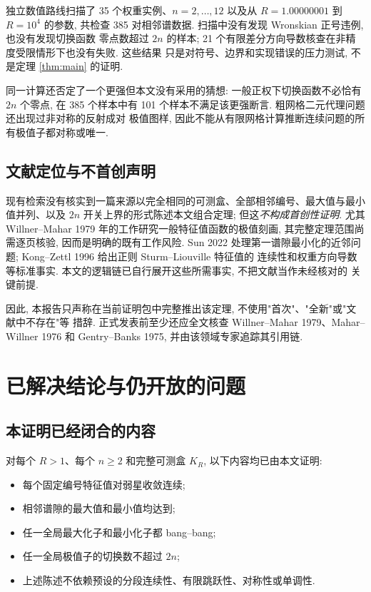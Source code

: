 \documentclass[UTF8]{ctexart}
\begin{document}
独立数值路线扫描了 35 个权重实例、$n=2,\dots,12$ 以及从 $R=1.00000001$ 到 $R=10^4$
的参数, 共检查 385 对相邻谱数据. 扫描中没有发现 Wronskian 正号违例, 也没有发现切换函数
零点数超过 $2n$ 的样本; 21 个有限差分方向导数核查在非精度受限情形下也没有失败. 这些结果
只是对符号、边界和实现错误的压力测试, 不是定理 \ref{thm:main} 的证明.

同一计算还否定了一个更强但本文没有采用的猜想: 一般正权下切换函数不必恰有 $2n$ 个零点,
在 385 个样本中有 101 个样本不满足该更强断言. 粗网格二元代理问题还出现过非对称的反射成对
极值图样, 因此不能从有限网格计算推断连续问题的所有极值子都对称或唯一.

\subsection{文献定位与不首创声明}

现有检索没有核实到一篇来源以完全相同的可测盒、全部相邻编号、最大值与最小值并列、以及
$2n$ 开关上界的形式陈述本文组合定理; 但这\emph{不构成首创性证明}. 尤其 Willner--Mahar 1979
年的工作研究一般特征值函数的极值刻画, 其完整定理范围尚需逐页核验, 因而是明确的既有工作风险.
Sun 2022 处理第一谱隙最小化的近邻问题; Kong--Zettl 1996 给出正则 Sturm--Liouville 特征值的
连续性和权重方向导数等标准事实. 本文的逻辑链已自行展开这些所需事实, 不把文献当作未经核对的
关键前提.

因此, 本报告只声称在当前证明包中完整推出该定理, 不使用"首次"、"全新"或"文献中不存在"等
措辞. 正式发表前至少还应全文核查 Willner--Mahar 1979、Mahar--Willner 1976 和 Gentry--Banks
1975, 并由该领域专家追踪其引用链.

\section{已解决结论与仍开放的问题}
\subsection{本证明已经闭合的内容}

对每个 $R>1$、每个 $n\ge2$ 和完整可测盒 $K_R$, 以下内容均已由本文证明:
\begin{itemize}
	\item 每个固定编号特征值对弱星收敛连续;
	\item 相邻谱隙的最大值和最小值均达到;
	\item 任一全局最大化子和最小化子都 bang--bang;
	\item 任一全局极值子的切换数不超过 $2n$;
	\item 上述陈述不依赖预设的分段连续性、有限跳跃性、对称性或单调性.
\end{itemize}
\end{document}

